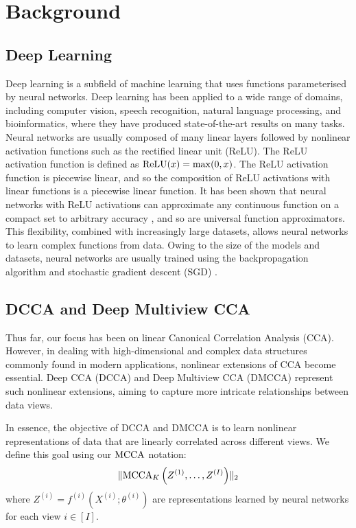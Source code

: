 \section{Background}

\subsection{Deep Learning}

Deep learning is a subfield of machine learning that uses functions parameterised by neural networks.
Deep learning has been applied to a wide range of domains, including computer vision, speech recognition, natural language processing, and bioinformatics, where they have produced state-of-the-art results on many tasks.
Neural networks are usually composed of many linear layers followed by nonlinear activation functions such as the rectified linear unit (ReLU).
The ReLU activation function is defined as $\operatorname{ReLU}(x) = \max(0, x)$.
The ReLU activation function is piecewise linear, and so the composition of ReLU activations with linear functions is a piecewise linear function.
It has been shown that neural networks with ReLU activations can approximate any continuous function on a compact set to arbitrary accuracy \citep{perekrestenko2018universal}, and so are universal function approximators.
This flexibility, combined with increasingly large datasets, allows neural networks to learn complex functions from data.
Owing to the size of the models and datasets, neural networks are usually trained using the backpropagation algorithm and stochastic gradient descent (SGD) \citep{amari1993backpropagation}.

\subsection{DCCA and Deep Multiview CCA}

Thus far, our focus has been on linear Canonical Correlation Analysis (CCA). However, in dealing with high-dimensional and complex data structures commonly found in modern applications, nonlinear extensions of CCA become essential.
Deep CCA (DCCA) and Deep Multiview CCA (DMCCA) represent such nonlinear extensions, aiming to capture more intricate relationships between data views.

In essence, the objective of DCCA and DMCCA is to learn nonlinear representations of data that are linearly correlated across different views.
We define this goal using our $\operatorname{MCCA}$ notation:
\begin{align}
    \label{eq:DMCCA-def}
    \lVert\operatorname{MCCA}_K\left(Z^{(1)}, \ldots, Z^{(I)}\right)\rVert_2
\end{align}
where $Z^{(i)} = f^{(i)}(X^{(i)}; \theta^{(i)})$ are representations learned by neural networks for each view $i \in [I]$.

